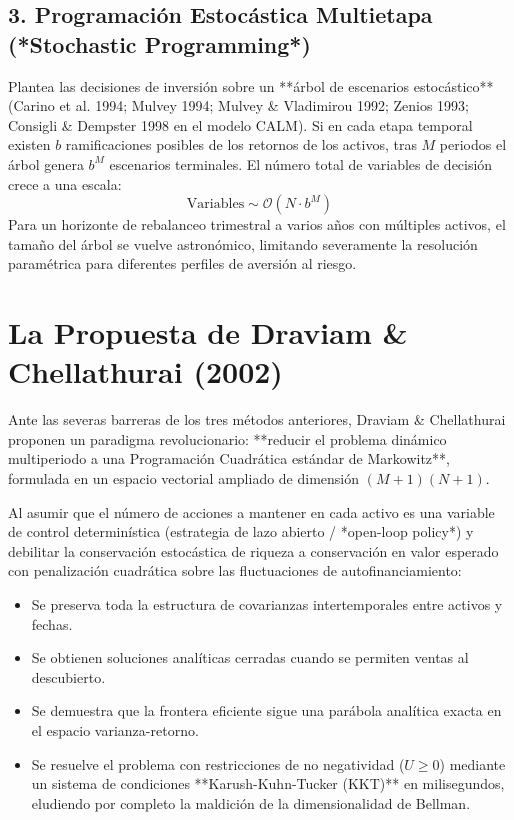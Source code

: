 \documentclass[11pt,a4paper]{report}
\numberwithin{equation}{chapter}
\begin{document}
\subsection{3. Programación Estocástica Multietapa (*Stochastic Programming*)}
Plantea las decisiones de inversión sobre un **árbol de escenarios estocástico** (Carino et al. 1994; Mulvey 1994; Mulvey \& Vladimirou 1992; Zenios 1993; Consigli \& Dempster 1998 en el modelo CALM). Si en cada etapa temporal existen $b$ ramificaciones posibles de los retornos de los activos, tras $M$ periodos el árbol genera $b^M$ escenarios terminales. El número total de variables de decisión crece a una escala:
\begin{equation}
    \text{Variables} \sim \mathcal{O}(N \cdot b^M)
\end{equation}
Para un horizonte de rebalanceo trimestral a varios años con múltiples activos, el tamaño del árbol se vuelve astronómico, limitando severamente la resolución paramétrica para diferentes perfiles de aversión al riesgo.

\section{La Propuesta de Draviam \& Chellathurai (2002)}

Ante las severas barreras de los tres métodos anteriores, Draviam \& Chellathurai proponen un paradigma revolucionario: **reducir el problema dinámico multiperiodo a una Programación Cuadrática estándar de Markowitz**, formulada en un espacio vectorial ampliado de dimensión $(M+1)(N+1)$. 

Al asumir que el número de acciones a mantener en cada activo es una variable de control determinística (estrategia de lazo abierto / *open-loop policy*) y debilitar la conservación estocástica de riqueza a conservación en valor esperado con penalización cuadrática sobre las fluctuaciones de autofinanciamiento:
\begin{itemize}
    \item Se preserva toda la estructura de covarianzas intertemporales entre activos y fechas.
    \item Se obtienen soluciones analíticas cerradas cuando se permiten ventas al descubierto.
    \item Se demuestra que la frontera eficiente sigue una parábola analítica exacta en el espacio varianza-retorno.
    \item Se resuelve el problema con restricciones de no negatividad ($U \ge 0$) mediante un sistema de condiciones **Karush-Kuhn-Tucker (KKT)** en milisegundos, eludiendo por completo la maldición de la dimensionalidad de Bellman.
\end{itemize}
\end{document}
